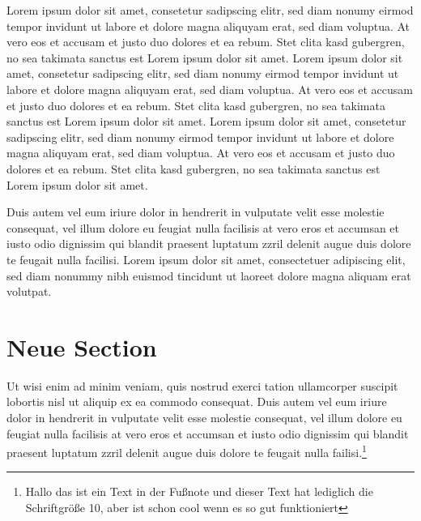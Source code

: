 \documentclass[\mainsize, a4paper, fleqn, xcolor=dvipsnames]{scrartcl}
\begin{document}
	
	
	
	
	\restoregeometry
	
	\newpage
	\thispagestyle{empty}
	\mbox{}
	\newpage
	
	\pagestyle{fancy}
	
	
	
Lorem ipsum dolor sit amet, consetetur sadipscing elitr, sed diam nonumy eirmod tempor invidunt ut labore et dolore magna aliquyam erat, sed diam voluptua. At vero eos et accusam et justo duo dolores et ea rebum. Stet clita kasd gubergren, no sea takimata sanctus est Lorem ipsum dolor sit amet. Lorem ipsum dolor sit amet, consetetur sadipscing elitr, sed diam nonumy eirmod tempor invidunt ut labore et dolore magna aliquyam erat, sed diam voluptua. At vero eos et accusam et justo duo dolores et ea rebum. Stet clita kasd gubergren, no sea takimata sanctus est Lorem ipsum dolor sit amet. Lorem ipsum dolor sit amet, consetetur sadipscing elitr, sed diam nonumy eirmod tempor invidunt ut labore et dolore magna aliquyam erat, sed diam voluptua. At vero eos et accusam et justo duo dolores et ea rebum. Stet clita kasd gubergren, no sea takimata sanctus est Lorem ipsum dolor sit amet.
 
Duis autem vel eum iriure dolor in hendrerit in vulputate velit esse molestie consequat, vel illum dolore eu feugiat nulla facilisis at vero eros et accumsan et iusto odio dignissim qui blandit praesent luptatum zzril delenit augue duis dolore te feugait nulla facilisi. Lorem ipsum dolor sit amet, consectetuer adipiscing elit, sed diam nonummy nibh euismod tincidunt ut laoreet dolore magna aliquam erat volutpat.

\section{Neue Section}
   
Ut wisi enim ad minim veniam, quis nostrud exerci tation ullamcorper suscipit lobortis nisl ut aliquip ex ea commodo consequat. Duis autem vel eum iriure dolor in hendrerit in vulputate velit esse molestie consequat, vel illum dolore eu feugiat nulla facilisis at vero eros et accumsan et iusto odio dignissim qui blandit praesent luptatum zzril delenit augue duis dolore te feugait nulla failisi.\footnote{Hallo das ist ein Text in der Fußnote und dieser Text hat lediglich die Schriftgröße 10, aber ist schon cool wenn es so gut funktioniert}
   
\end{document}
